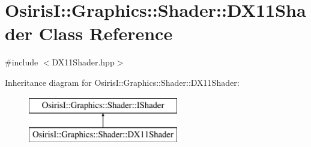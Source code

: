 \hypertarget{class_osiris_i_1_1_graphics_1_1_shader_1_1_d_x11_shader}{\section{Osiris\-I\-:\-:Graphics\-:\-:Shader\-:\-:D\-X11\-Shader Class Reference}
\label{class_osiris_i_1_1_graphics_1_1_shader_1_1_d_x11_shader}
}


{\ttfamily \#include $<$D\-X11\-Shader.\-hpp$>$}

Inheritance diagram for Osiris\-I\-:\-:Graphics\-:\-:Shader\-:\-:D\-X11\-Shader\-:\begin{figure}[H]
\begin{center}
\leavevmode
\includegraphics[height=2.000000cm]{class_osiris_i_1_1_graphics_1_1_shader_1_1_d_x11_shader}
\end{center}
\end{figure}

